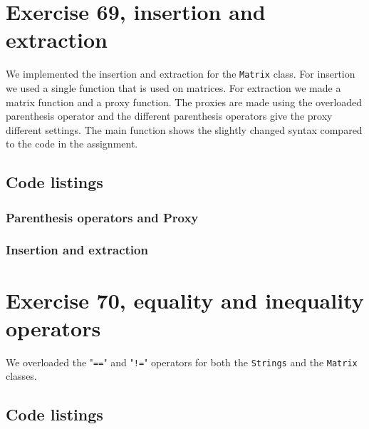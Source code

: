 \documentclass[11pt]{article}
\begin{document}
\section*{Exercise 69, insertion and extraction}
We implemented the insertion and extraction for the \texttt{Matrix} class.
For insertion we used a single function that is used on matrices.
For extraction we made a matrix function and a proxy function.
The proxies are made using the overloaded parenthesis operator and the different parenthesis operators give the proxy different settings.
The main function shows the slightly changed syntax compared to the code in the assignment.

\subsection*{Code listings}


\subsubsection*{Parenthesis operators and Proxy}








\subsubsection*{Insertion and extraction}




\section*{Exercise 70, equality and inequality operators}
We overloaded the "\texttt{==}" and "\texttt{!=}" operators for both the \texttt{Strings} and the \texttt{Matrix} classes.

\subsection*{Code listings}
\end{document}
